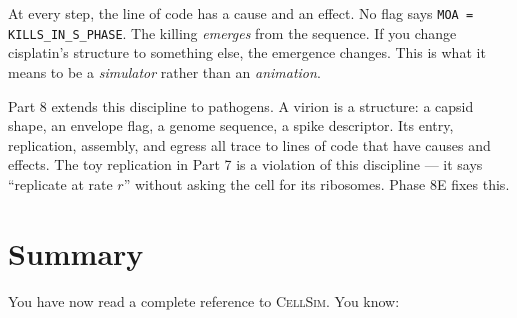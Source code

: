 \documentclass[11pt,letterpaper,twoside,openany]{book}
\begin{document}
At every step, the line of code has a cause and an effect. No flag
says \texttt{MOA = KILLS\_IN\_S\_PHASE}. The killing \emph{emerges}
from the sequence. If you change cisplatin's structure to something
else, the emergence changes. This is what it means to be a
\emph{simulator} rather than an \emph{animation}.

Part 8 extends this discipline to pathogens. A virion is a
structure: a capsid shape, an envelope flag, a genome sequence, a
spike descriptor. Its entry, replication, assembly, and egress all
trace to lines of code that have causes and effects. The toy
replication in Part 7 is a violation of this discipline --- it
says ``replicate at rate $r$'' without asking the cell for its
ribosomes. Phase 8E fixes this.

\chapter{Summary}
\label{ch:summary}

You have now read a complete reference to \textsc{CellSim}. You
know:
\end{document}
